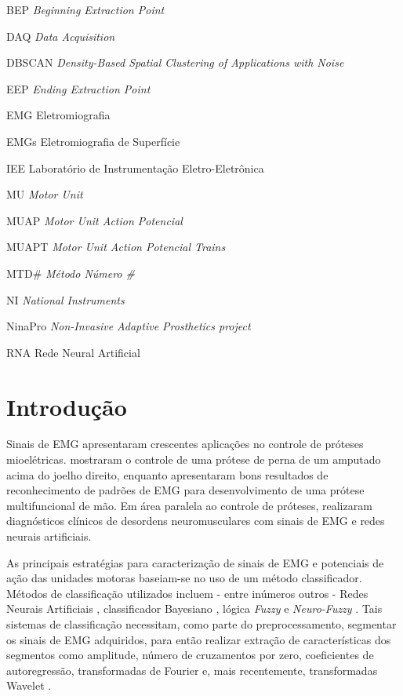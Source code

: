 \begin{siglas}
	\item[BEP]		\emph{Beginning Extraction Point}
	\item[DAQ]		\emph{Data Acquisition}
	\item[DBSCAN]	\emph{Density-Based Spatial Clustering of Applications with Noise}
	\item[EEP]		\emph{Ending Extraction Point}
  	\item[EMG]		Eletromiografia
	\item[EMGs]		Eletromiografia de Superfície
	\item[IEE]		Laboratório de Instrumentação Eletro-Eletrônica
	\item[MU]		\emph{Motor Unit}
  	\item[MUAP]		\emph{Motor Unit Action Potencial}
	\item[MUAPT]	\emph{Motor Unit Action Potencial Trains}
	\item[MTD\#]	\emph{Método Número \#}
	\item[NI]		\emph{National Instruments}
	\item[NinaPro]	\emph{Non-Invasive Adaptive Prosthetics project}
	\item[RNA]		Rede Neural Artificial
\end{siglas}

\tableofcontents*
\cleardoublepage

\textual
	\chapter{Introdução}
Sinais de EMG apresentaram crescentes aplicações no controle de próteses mioelétricas.  mostraram o controle de uma prótese de perna de um amputado acima do joelho direito, enquanto  apresentaram bons resultados de reconhecimento de padrões de EMG para desenvolvimento de uma prótese multifuncional de mão. Em área paralela ao controle de próteses,  realizaram diagnósticos clínicos de desordens neuromusculares com sinais de EMG e redes neurais artificiais.

As principais estratégias para caracterização de sinais de EMG e potenciais de ação das unidades motoras baseiam-se no uso de um método classificador. Métodos de classificação utilizados incluem - entre inúmeros outros - Redes Neurais Artificiais \cite{Hudgins1993}, classificador Bayesiano \cite{Englehart2003}, lógica \emph{Fuzzy} \cite{Chan2000} e \emph{Neuro-Fuzzy} \cite{Favieiro2011}. Tais sistemas de classificação necessitam, como parte do preprocessamento, segmentar os sinais de EMG adquiridos, para então realizar extração de características dos segmentos como amplitude, número de cruzamentos por zero, coeficientes de autoregressão, transformadas de Fourier e, mais recentemente, transformadas Wavelet \cite{Jun-UkChu2007}.

